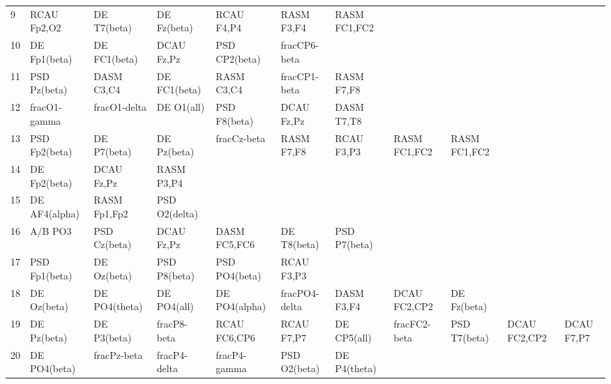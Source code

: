 \begin{landscape}
\begin{table}[]
\begin{tabular}{l|llllllll}
9        & RCAU Fp2,O2    & DE T7(beta)    & DE Fz(beta)    & RCAU F4,P4     & RASM F3,F4     & RASM FC1,FC2   &               &                &               &               \\
10       & DE Fp1(beta)   & DE FC1(beta)   & DCAU Fz,Pz     & PSD CP2(beta)  & fracCP6-beta   &                &               &                &               &               \\
11       & PSD Pz(beta)   & DASM C3,C4     & DE FC1(beta)   & RASM C3,C4     & fracCP1-beta   & RASM F7,F8     &               &                &               &               \\
12       & fracO1-gamma   & fracO1-delta   & DE O1(all)     & PSD F8(beta)   & DCAU Fz,Pz     & DASM T7,T8     &               &                &               &               \\
13       & PSD Fp2(beta)  & DE P7(beta)    & DE Pz(beta)    & fracCz-beta    & RASM F7,F8     & RCAU F3,P3     & RASM FC1,FC2  & RASM FC1,FC2   &               &               \\
14       & DE Fp2(beta)   & DCAU Fz,Pz     & RASM P3,P4     &                &                &                &               &                &               &               \\
15       & DE AF4(alpha)  & RASM Fp1,Fp2   & PSD O2(delta)  &                &                &                &               &                &               &               \\
16       & A/B PO3        & PSD Cz(beta)   & DCAU Fz,Pz     & DASM FC5,FC6   & DE T8(beta)    & PSD P7(beta)   &               &                &               &               \\
17       & PSD Fp1(beta)  & DE Oz(beta)    & PSD P8(beta)   & PSD PO4(beta)  & RCAU F3,P3     &                &               &                &               &               \\
18       & DE Oz(beta)    & DE PO4(theta)  & DE PO4(all)    & DE PO4(alpha)  & fracPO4-delta  & DASM F3,F4     & DCAU FC2,CP2  & DE Fz(beta)    &               &               \\
19       & DE Pz(beta)    & DE P3(beta)    & fracP8-beta    & RCAU FC6,CP6   & RCAU F7,P7     & DE CP5(all)    & fracFC2-beta  & PSD T7(beta)   & DCAU FC2,CP2  & DCAU F7,P7    \\
20       & DE PO4(beta)   & fracPz-beta    & fracP4-delta   & fracP4-gamma   & PSD O2(beta)   & DE P4(theta)   &               &                &               &               \\

\end{tabular}
\end{table}
\end{landscape}
